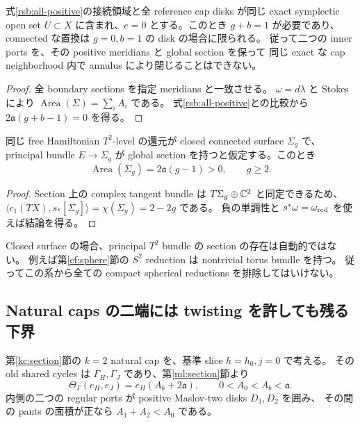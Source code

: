\begin{corollary}\label{rsb:exact-obstruction}
式\eqref{rsb:all-positive}の接続領域と全 reference cap disks が同じ exact symplectic open set
$U\subset X$ に含まれ、$e=0$ とする。このとき $g+b=1$ が必要であり、
connected な置換は $g=0,b=1$ の disk の場合に限られる。
従って二つの inner ports を、その positive meridians と global section を保って
同じ exact な cap neighborhood 内で annulus により閉じることはできない。
\end{corollary}

\begin{proof}
全 boundary sections を指定 meridians と一致させる。
$\omega=d\lambda$ と Stokes により
$\operatorname{Area}(\Sigma)=\sum_i A_i$ である。
式\eqref{rsb:all-positive}との比較から $2\mathfrak a(g+b-1)=0$ を得る。
\end{proof}

\begin{corollary}\label{rsb:closed-section}
同じ free Hamiltonian $T^2$-level の還元が closed connected surface $\Sigma_g$ で、
principal bundle $E\to\Sigma_g$ が global section を持つと仮定する。このとき
\[
 \operatorname{Area}(\Sigma_g)=2\mathfrak a(g-1)>0,
 \qquad g\ge2.
\]
\end{corollary}

\begin{proof}
Section 上の complex tangent bundle は $T\Sigma_g\oplus\mathbb C^2$ と同定できるため、
$\langle c_1(TX),s_*[\Sigma_g]\rangle=\chi(\Sigma_g)=2-2g$ である。
負の単調性と $s^*\omega=\omega_{\rm red}$ を使えば結論を得る。
\end{proof}

Closed surface の場合、principal $T^2$ bundle の section の存在は自動的ではない。
例えば第\ref{cf:sphere}節の $S^2$ reduction は nontrivial torus bundle を持つ。
従ってこの系から全ての compact spherical reductions を排除してはいけない。

\subsection{Natural caps の二端には twisting を許しても残る下界}

第\ref{kc:section}節の $k=2$ natural cap を、基準 slice $h=h_0,j=0$ で考える。
その old shared cycles は $\Gamma_H,\Gamma_J$ であり、第\ref{ml:section}節より
\begin{equation}\label{rsb:natural-covector}
 \Theta_\Gamma(e_H,e_J)=e_H(A_b+2\mathfrak a),
 \qquad 0<A_0<A_b<\mathfrak a.
\end{equation}
内側の二つの regular ports が positive Maslov-two disks $D_1,D_2$ を囲み、
その間の pants の面積が正なら $A_1+A_2<A_0$ である。

